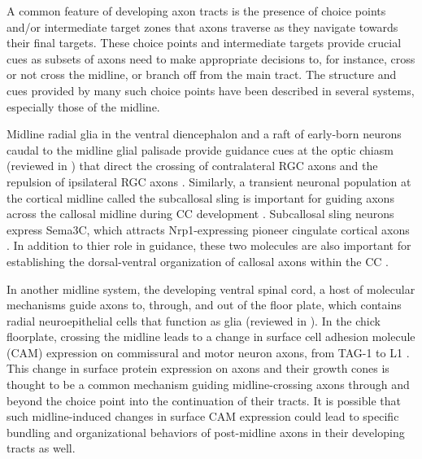 A common feature of developing axon tracts is the presence of choice points and/or intermediate target zones that axons traverse as they navigate towards their final targets.
These choice points and intermediate targets provide crucial cues as subsets of axons need to make appropriate decisions to, for instance, cross or not cross the midline, or branch off from the main tract.
The structure and cues provided by many such choice points have been described in several systems, especially those of the midline.

Midline radial glia in the ventral diencephalon and a raft of early-born neurons caudal to the midline glial palisade provide guidance cues at the optic chiasm (reviewed in \cite{erskine2014connecting,petros2008retinal}) that direct the crossing of contralateral RGC axons \cite{charron2003morphogen,erskine2011vegf,kuwajima2012optic,williams2006role} and the repulsion of ipsilateral RGC axons \cite{williams2003ephrin,petros2010ephrin,petros2009specificity,}. 
Similarly, a transient neuronal population at the cortical midline called the subcallosal sling is important for guiding axons across the callosal midline during CC development \cite{suarez2014evolution}. 
Subcallosal sling neurons express Sema3C, which attracts Nrp1-expressing pioneer cingulate cortical axons \cite{niquille2009transient,piper2009neuropilin}. 
In addition to thier role in guidance, these two molecules are also important for establishing the dorsal-ventral organization of callosal axons within the CC \cite{zhou2013axon}. 

In another midline system, the developing ventral spinal cord, a host of molecular mechanisms guide axons to, through, and out of the floor plate, which contains radial neuroepithelial cells that function as glia (reviewed in \cite{neuhaus2015crossing}).
In the chick floorplate, crossing the midline leads to a change in surface cell adhesion molecule (CAM) expression on commissural and motor neuron axons, from TAG-1 to L1 \cite{dodd1988spatial}. 
This change in surface protein expression on axons and their growth cones is thought to be a common mechanism guiding midline-crossing axons through and beyond the choice point into the continuation of their tracts.
It is possible that such midline-induced changes in surface CAM expression could lead to specific bundling and organizational behaviors of post-midline axons in their developing tracts as well.

